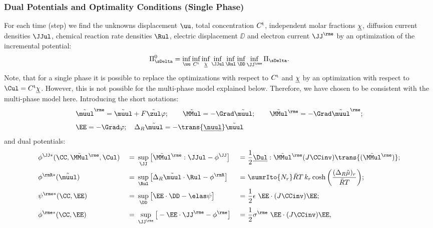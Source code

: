 \subsubsection{Dual Potentials and Optimality Conditions (Single Phase)} %

For each time (step) we find the unknowns displacement $\uu$, total concentration $C^{\rm t}$, independent molar fractions $\underline{\chi}$, diffusion current densities $\JJul$, chemical reaction rate densities $\Rul$, electric displacement $\DD$ and electron current $\JJe$ by an optimization of the incremental potential:
\begin{align}
  \PiDeltaO = \inf_{\uu} \inf_{\Ct} \inf_{\chiul} \inf_{\JJul} \inf_{\Rul} \inf_{\DD} \inf_{\JJe} \PiDelta. \label{eq:SinglePhaseOpt}
\end{align}
Note, that for a single phase it is possible to replace the optimizations with respect to $C^{\rm t}$ and $\underline{\chi}$ by an optimization with respect to $\Cul=\Ct\chiul$. However, this is not possible for the multi-phase model explained below. Therefore, we have chosen to be consistent with the multi-phase model here. Introducing the short notations:
\begin{align}
  \begin{aligned}
    &\muuletilde = \muultilde+F\zultilde\varphi; \qquad \MMultilde=-\Grad\muultilde; \qquad  \MMuletilde=-\Grad\muuletilde; \\[3pt]
    &\EE=-\Grad\varphi; \quad \Delta_R\muultilde = -\trans{\nuull}\muultilde
  \end{aligned}
\end{align}
and dual potentials:
  \begin{alignat}{3}
    &\phiJJs(\CC,\MMuletilde,\Cul) \ &=& \ \sup_{\JJ}\big[\MMuletilde:\JJul - \phiJJ \big] \ &=& \ \frac{1}{2}\Dull:\MMuletilde (J\CCinv)\trans{(\MMuletilde)}; \\
    &\phiRs(\muultilde) \ &=& \ \sup_{\Rul}\big[\Delta_R \muultilde \cdot \Rul-\phiR\big] \ &=& \ \sumrIto{N_r} \RT \,k_r\cosh\bigg(\frac{(\Delta_R\tilde\mu)_r}{\RT}\bigg);\\
    &\psies(\CC,\EE) \ &=& \ \sup_{\DD} \big[ \EE\cdot\DD - \psie \big] \ &=& \ \frac{1}{2}\epsilon \ \EE \cdot (J\CCinv)\EE; \\
    &\phies(\CC,\EE) \ &=& \ \sup_{\JJe} \big[ -\EE\cdot\JJe - \phie \big] \ &=& \ \frac{1}{2} \sigmae \ \EE \cdot (J\CCinv)\EE,
  \end{alignat}
